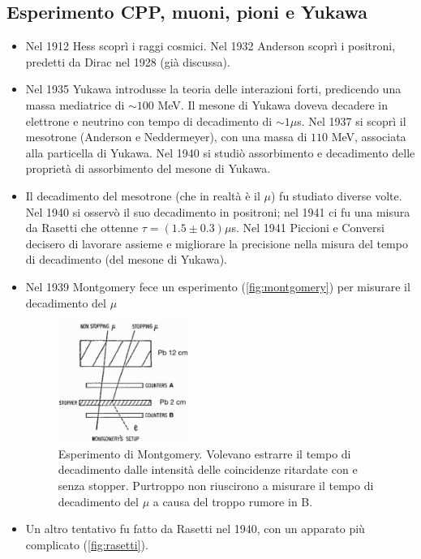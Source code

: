 \subsection{Esperimento CPP, muoni, pioni e Yukawa}
\begin{itemize}
    \item Nel 1912 Hess scoprì i raggi cosmici. Nel 1932 Anderson scoprì i positroni, predetti da Dirac nel 1928 (già discussa).
    \item Nel 1935 Yukawa introdusse la teoria delle interazioni forti, predicendo una massa mediatrice di $\sim 100$ MeV. Il mesone di Yukawa doveva decadere in elettrone e neutrino con tempo di decadimento di $\sim1\mu$s. Nel 1937 si scoprì il mesotrone (Anderson e Neddermeyer), con una massa di $110$ MeV, associata alla particella di Yukawa. Nel 1940 si studiò assorbimento e decadimento delle proprietà di assorbimento del mesone di Yukawa.
    \item Il decadimento del mesotrone (che in realtà è il $\mu$) fu studiato diverse volte. Nel 1940 si osservò il suo decadimento in positroni; nel 1941 ci fu una misura da Rasetti che ottenne $\tau=(1.5\pm0.3)\mu$s. Nel 1941 Piccioni e Conversi decisero di lavorare assieme e migliorare la precisione nella misura del tempo di decadimento (del mesone di Yukawa).
    \item Nel 1939 Montgomery fece un esperimento (\autoref{fig:montgomery}) per misurare il decadimento del $\mu$
    \begin{figure}[h]
        \centering
        \includegraphics[width=0.4\textwidth]{immagini/fig_montgomery.png}
        \caption{Esperimento di Montgomery. Volevano estrarre il tempo di decadimento dalle intensità delle coincidenze ritardate con e senza stopper. Purtroppo non riuscirono a misurare il tempo di decadimento del $\mu$ a causa del troppo rumore in B.}
        \label{fig:montgomery}
    \end{figure}
    \item Un altro tentativo fu fatto da Rasetti nel 1940, con un apparato più complicato (\autoref{fig:rasetti}).

\end{itemize}
